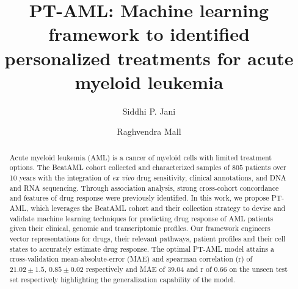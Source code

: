 \documentclass[runningheads,10pt]{llncs}
\begin{document}
%
\title{PT-AML: Machine learning framework to identified personalized treatments for acute myeloid leukemia}

%
\author{Siddhi P. Jani \and
Raghvendra Mall}
%
%
%
\maketitle              %
%
\begin{abstract}
Acute myeloid leukemia (AML) is a cancer of myeloid cells with limited treatment options. 
The BeatAML cohort collected and characterized samples of $805$ patients over 10 years with the integration of \textit{ex vivo} drug sensitivity, clinical annotations, and DNA and RNA sequencing. 
Through association analysis, strong cross-cohort concordance and features of drug response were previously identified. 
In this work, we propose PT-AML, which leverages the BeatAML cohort and their collection strategy to devise and validate machine learning techniques for predicting drug response of AML patients given their clinical, genomic and transcriptomic profiles.
Our framework engineers vector representations for drugs, their relevant pathways, patient profiles and their cell states to accurately estimate drug response. 
The optimal PT-AML model attains a cross-validation mean-absolute-error (MAE) and spearman correlation (r) of $21.02 \pm 1.5$, $0.85 \pm 0.02$ respectively and MAE of 39.04 and r of 0.66 on the unseen test set respectively highlighting the generalization capability of the model.  

\end{abstract}
\end{document}
